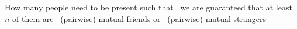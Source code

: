 \documentclass[preview]{standalone}
\begin{document}
\begin{center}
How many people need to be present such that \ we are guaranteed that at least $n$ of them are \ (pairwise) mutual friends or \ (pairwise) mutual strangers
\end{center}
\end{document}
